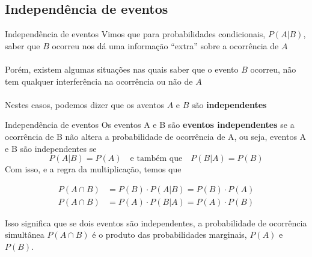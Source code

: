 \documentclass[10pt]{beamer}\usepackage[]{graphicx}\usepackage[]{color}
\theoremstyle{definition}
\begin{document}

\subsection{Independência de eventos}

\begin{frame}{Independência de eventos}
  Vimos que para probabilidades condicionais, $P(A|B)$, saber que $B$
  ocorreu nos dá uma informação ``extra'' sobre a ocorrência de $A$ \\~\\
  Porém, existem algumas situações nas quais saber que o evento $B$
  ocorreu, não tem qualquer interferência na ocorrência ou não de $A$\\~\\
  Nestes casos, podemos dizer que os aventos $A$ e $B$ são
  \textbf{independentes}
\end{frame}

\begin{frame}{Independência de eventos}
  Os eventos A e B são \textbf{eventos independentes} se a ocorrência de
  B não altera a probabilidade de ocorrência de A, ou seja, eventos A e
  B são independentes se
  \begin{equation*}
    P(A|B) = P(A) \quad \text{e também que} \quad P(B|A) = P(B)
  \end{equation*}
  Com isso, e a regra da multiplicação, temos que
  \begin{block}{}
    \begin{align*}
      P(A \cap B) &= P(B) \cdot P(A|B) = P(B) \cdot P(A) \\
      P(A \cap B) &= P(A) \cdot P(B|A) = P(A) \cdot P(B)
    \end{align*}
  \end{block}
  Isso significa que se dois eventos são independentes, a probabilidade
  de ocorrência simultânea $P(A \cap B)$ é o produto das probabilidades
  marginais, $P(A)$ e $P(B)$.
\end{frame}
\end{document}
